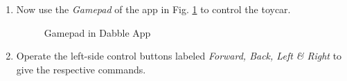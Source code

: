 \documentclass[conference]{IEEEtran}
\begin{document}
\begin{enumerate}
\item Now use the {\em Gamepad} of the app in Fig. \ref{fig:dabble_gamepad} to control the toycar.
\begin{figure}[!h]
\centering
{}%
\caption{Gamepad in Dabble App}
\label{fig:dabble_gamepad}
\end{figure}

\item Operate the left-side control buttons labeled \textit{Forward, Back, Left \& Right} to give the respective commands.
\end{enumerate}
\end{document}
